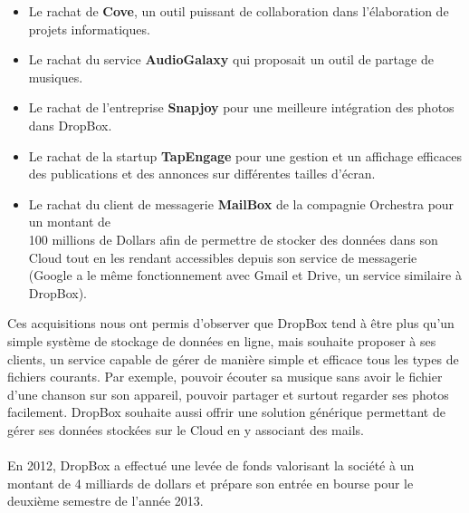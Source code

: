 \documentclass[a4paper, 10pt]{article}
\begin{document}
\begin{itemize}
 \item Le rachat de \textbf{Cove}, un outil puissant de collaboration dans l'\'elaboration de projets informatiques.
 \item Le rachat du service \textbf{AudioGalaxy} qui proposait un outil de partage de musiques.
 \item Le rachat de l'entreprise \textbf{Snapjoy} pour une meilleure int\'egration des photos dans DropBox.
 \item Le rachat de la startup \textbf{TapEngage} pour une gestion et un affichage efficaces des publications et des annonces
sur diff\'erentes tailles d'\'ecran.
 \item Le rachat du client de messagerie \textbf{MailBox} de la compagnie Orchestra pour un montant de\\100 millions de Dollars
afin de permettre de stocker des donn\'ees dans son Cloud tout en les rendant accessibles depuis son service de messagerie
(Google a le m\^eme fonctionnement avec Gmail et Drive, un service similaire \`a DropBox).
\end{itemize}
Ces acquisitions nous ont permis d'observer que DropBox tend \`a \^etre plus qu'un simple syst\`eme de stockage de donn\'ees en ligne,
mais souhaite proposer \`a ses clients, un service capable de g\'erer de mani\`ere simple et efficace
tous les types de fichiers courants.
Par exemple, pouvoir \'ecouter sa musique sans avoir le fichier d'une chanson sur son appareil,
pouvoir partager et surtout regarder ses photos facilement.
DropBox souhaite aussi offrir une solution g\'en\'erique permettant de g\'erer ses donn\'ees stock\'ees sur le Cloud en y associant des mails.\\ \\
En 2012, DropBox a effectu\'e une lev\'ee de fonds valorisant la soci\'et\'e \`a un montant de 4 milliards de dollars et
pr\'epare son entr\'ee en bourse pour le deuxi\`eme semestre de l'ann\'ee 2013.\\ \\
\end{document}
